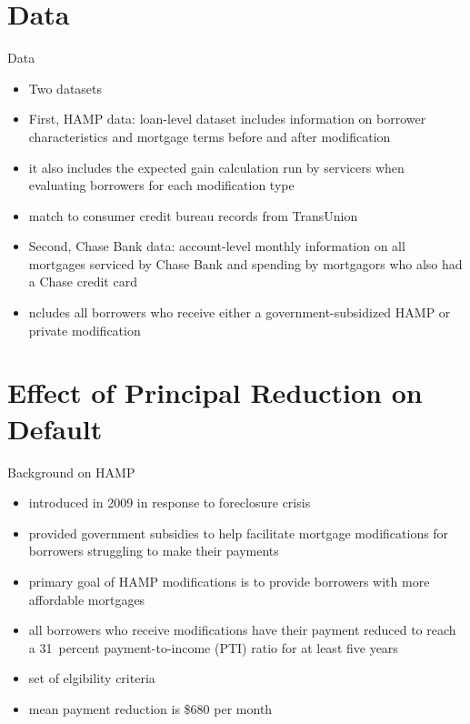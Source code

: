 \section{Data}
\begin{frame}{Data}
	\begin{itemize}
		\item Two datasets
        \item First, HAMP data: loan-level dataset includes information on borrower characteristics and mortgage terms before and after modification
        \item it also includes the expected gain calculation run by servicers when evaluating borrowers for each modification type
        \item match to consumer credit bureau records from TransUnion
        \item Second, Chase Bank data: account-level monthly information on all mortgages serviced by Chase Bank and spending by mortgagors who also had a Chase credit card
        \item ncludes all borrowers who receive either a government-subsidized HAMP or private modification
	\end{itemize}
\end{frame}


\section{Effect of Principal Reduction on Default}

\begin{frame}{Background on HAMP}
    \begin{itemize}
         \item introduced in 2009 in response to foreclosure crisis
         \item provided government subsidies to help facilitate mortgage modifications for borrowers struggling to make their payments
         \item primary goal of HAMP modifications is to provide borrowers with more affordable mortgages
         \item all borrowers who receive modifications have their payment reduced to reach a 31 percent payment-to-income (PTI) ratio for at least five years
         \item set of elgibility criteria 
         \item mean payment reduction is \$680 per month
    \end{itemize}
 \end{frame}

